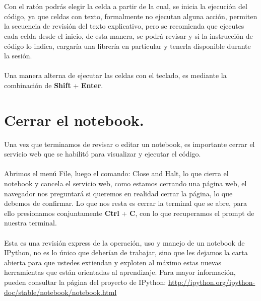 \documentclass[12pt]{article}
\begin{document}
\\
\\
Con el ratón podrás elegir la celda a partir de la cual, se inicia la ejecución del código, ya que celdas con texto, formalmente no ejecutan alguna acción, permiten la secuencia de revisión del texto explicativo, pero se recomienda que ejecutes cada celda desde el inicio, de esta manera, se podrá revisar y si la instrucción de código lo indica, cargaría una librería en particular y tenerla disponible durante la sesión.
\\
\\
Una manera alterna de ejecutar las celdas con el teclado, es mediante la combinación de \textbf{Shift} + \textbf{Enter}.
\section{Cerrar el notebook.}
Una vez que terminamos de revisar o editar un notebook, es importante cerrar el servicio web que se habilitó para visualizar y ejecutar el código.
\\
\\
Abrimos el menú File, luego el comando: Close and Halt, lo que cierra el notebook y cancela el servicio web, como estamos cerrando una página web, el navegador nos preguntará si queremos en realidad cerrar la página, lo que debemos de confirmar. Lo que nos resta es cerrar la terminal que se abre, para ello presionamos conjuntamente \textbf{Ctrl} + \textbf{C}, con lo que recuperamos el prompt de nuestra terminal.
\\
\\
Esta es una revisión express de la operación, uso y manejo de un notebook de IPython, no es lo único que deberían de trabajar, sino que les dejamos la carta abierta para que ustedes extiendan y exploten al máximo estas nuevas herramientas que están orientadas al aprendizaje. Para mayor información, pueden consultar la página del proyecto de IPython: \url{http://ipython.org/ipython-doc/stable/notebook/notebook.html}
\end{document}
